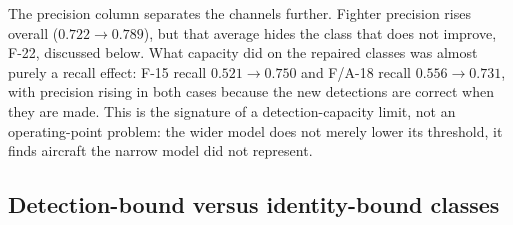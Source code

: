 \documentclass[conference]{IEEEtran}
\begin{document}
The precision column separates the channels further. Fighter precision rises
overall ($0.722\rightarrow0.789$), but that average hides the class that does
not improve, F-22, discussed below. What capacity did on the repaired classes
was almost purely a recall effect: F-15 recall $0.521\rightarrow0.750$ and F/A-18
recall $0.556\rightarrow0.731$, with precision rising in both cases because the
new detections are correct when they are made. This is the signature of a
detection-capacity limit, not an operating-point problem: the wider model does
not merely lower its threshold, it finds aircraft the narrow model did not
represent.

\subsection{Detection-bound versus identity-bound classes}
\end{document}
